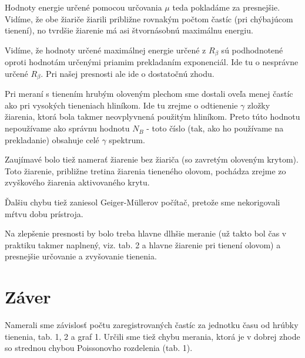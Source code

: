 \documentclass[a4paper, 10pt]{article}
\begin{document}
Hodnoty energie určené pomocou určovania $\mu$ teda pokladáme za presnejšie. Vidíme, že obe žiariče žiarili približne rovnakým počtom častíc (pri chýbajúcom tienení), no tvrdšie žiarenie má asi štvornásobnú maximálnu energiu. 

Vidíme, že hodnoty určené maximálnej energie určené z $R_\beta$ sú podhodnotené oproti hodnotám určenými priamim prekladaním exponenciál. Ide tu o nesprávne určené $R_\beta$. Pri našej presnosti ale ide o dostatočnú zhodu.

Pri meraní s tienením hrubým oloveným plechom sme dostali oveľa menej častíc ako pri vysokých tieneniach hliníkom. Ide tu zrejme o odtienenie $\gamma$ zložky žiarenia, ktorá bola takmer neovplyvnená použitým hliníkom. Preto túto hodnotu nepoužívame ako správnu hodnotu $N_B$ - toto číslo (tak, ako ho používame na prekladanie) obsahuje celé $\gamma$ spektrum.  

Zaujímavé bolo tiež namerať žiarenie bez žiariča (so zavretým oloveným krytom). Toto žiarenie, približne tretina žiarenia tieneného olovom, pochádza zrejme zo zvyškového žiarenia aktivovaného krytu. 

Ďalšiu chybu tiež zaniesol Geiger-M\"ullerov počítač, pretože sme nekorigovali mŕtvu dobu prístroja. 

Na zlepšenie presnosti by bolo treba hlavne dlhšie meranie (už takto bol čas v praktiku takmer naplnený, viz. tab. 2 a hlavne žiarenie pri tienení olovom) a presnejšie určovanie a zvyšovanie tienenia.

\section*{Záver}
Namerali sme závislosť počtu zaregistrovaných častíc za jednotku času od hrúbky tienenia, tab. 1, 2 a graf 1. Určili sme tiež chybu merania, ktorá je v dobrej zhode so strednou chybou Poissonovho rozdelenia (tab. 1).
\end{document}
